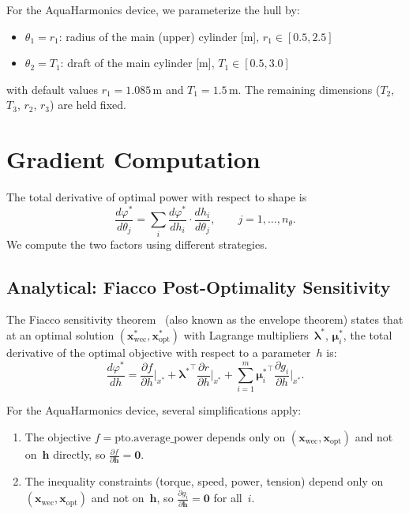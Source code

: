 \documentclass[11pt,a4paper]{article}
\newcommand{\vp}{\varphi}
\newcommand{\xwec}{\bm{x}_{\mathrm{wec}}}
\newcommand{\xopt}{\bm{x}_{\mathrm{opt}}}
\newcommand{\bh}{\bm{h}}
\newcommand{\blam}{\bm{\lambda}}
\newcommand{\bmu}{\bm{\mu}}
\newcommand{\pd}[2]{\frac{\partial #1}{\partial #2}}
\newcommand{\dd}[2]{\frac{d #1}{d #2}}
\begin{document}
For the AquaHarmonics device, we parameterize the hull by:
\begin{itemize}
    \item $\theta_1 = r_1$: radius of the main (upper) cylinder [m],
          $r_1 \in [0.5, 2.5]$
    \item $\theta_2 = T_1$: draft of the main cylinder [m],
          $T_1 \in [0.5, 3.0]$
\end{itemize}
with default values $r_1 = 1.085$\,m and $T_1 = 1.5$\,m.  The
remaining dimensions ($T_2$, $T_3$, $r_2$, $r_3$) are held fixed.


\section{Gradient Computation}
\label{sec:gradient}

The total derivative of optimal power with respect to shape is
\begin{equation}
\label{eq:chain_rule}
    \dd{\vp^*}{\theta_j}
    = \sum_{i} \dd{\vp^*}{h_i} \cdot \dd{h_i}{\theta_j},
    \qquad j = 1, \ldots, n_\theta.
\end{equation}
We compute the two factors using different strategies.

\subsection{Analytical: Fiacco Post-Optimality Sensitivity}
\label{sec:fiacco}

The Fiacco sensitivity theorem~\citep{fiacco1976sensitivity} (also
known as the envelope theorem) states that at an optimal solution
$(\xwec^*, \xopt^*)$ with Lagrange multipliers~$\blam^*$,
$\bmu_i^*$, the total derivative of the optimal objective with
respect to a parameter~$h$ is:
\begin{equation}
\label{eq:fiacco_full}
    \dd{\vp^*}{h}
    = \pd{f}{h}\bigg|_{x^*}
    + {\blam^*}^\top \pd{r}{h}\bigg|_{x^*}
    + \sum_{i=1}^{m} {\bmu_i^*}^\top \pd{g_i}{h}\bigg|_{x^*}.
\end{equation}

For the AquaHarmonics device, several simplifications apply:
\begin{enumerate}
    \item The objective $f = \text{pto.average\_power}$ depends only on
          $(\xwec, \xopt)$ and not on~$\bh$ directly, so
          $\pd{f}{\bh} = \bm{0}$.
    \item The inequality constraints (torque, speed, power, tension)
          depend only on $(\xwec, \xopt)$ and not on~$\bh$, so
          $\pd{g_i}{\bh} = \bm{0}$ for all~$i$.
\end{enumerate}
\end{document}
